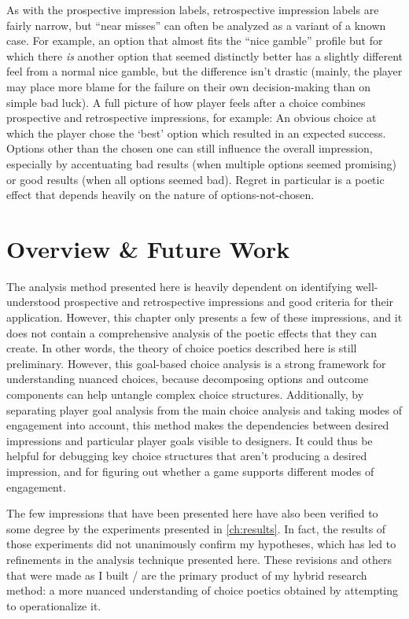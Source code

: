As with the prospective impression labels, retrospective impression labels are fairly narrow, but ``near misses'' can often be analyzed as a variant of a known case.
%
For example, an option that almost fits the ``nice gamble'' profile but for which there \emph{is} another option that seemed distinctly better has a slightly different feel from a normal nice gamble, but the difference isn't drastic (mainly, the player may place more blame for the failure on their own decision-making than on simple bad luck).
%
A full picture of how player feels after a choice combines prospective and retrospective impressions, for example: An obvious choice at which the player chose the `best' option which resulted in an expected success.
%
Options other than the chosen one can still influence the overall impression, especially by accentuating bad results (when multiple options seemed promising) or good results (when all options seemed bad).
%
Regret in particular is a poetic effect that depends heavily on the nature of options-not-chosen.


\section{Overview \& Future Work}

The analysis method presented here is heavily dependent on identifying well-understood prospective and retrospective impressions and good criteria for their application.
%
However, this chapter only presents a few of these impressions, and it does not contain a comprehensive analysis of the poetic effects that they can create.
%
In other words, the theory of choice poetics described here is still preliminary.
%
However, this goal-based choice analysis is a strong framework for understanding nuanced choices, because decomposing options and outcome components can help untangle complex choice structures.
%
Additionally, by separating player goal analysis from the main choice analysis and taking modes of engagement into account, this method makes the dependencies between desired impressions and particular player goals visible to designers.
%
It could thus be helpful for debugging key choice structures that aren't producing a desired impression, and for figuring out whether a game supports different modes of engagement.


The few impressions that have been presented here have also been verified to some degree by the experiments presented in \cref{ch:results}.
%
In fact, the results of those experiments did not unanimously confirm my hypotheses, which has led to refinements in the analysis technique presented here.
%
These revisions and others that were made as I built \dunyazad/ are the primary product of my hybrid research method: a more nuanced understanding of choice poetics obtained by attempting to operationalize it.


